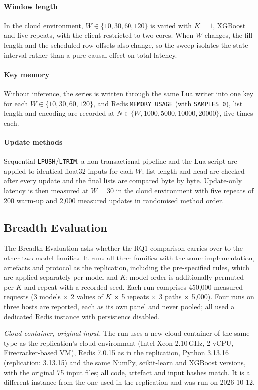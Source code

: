 \documentclass[a4paper,fleqn]{cas-dc}
\begin{document}
\paragraph{Window length} In the cloud environment, $W\in\{10,30,60,120\}$ is varied with $K=1$, XGBoost and five repeats, with the client restricted to two cores. When $W$ changes, the fill length and the scheduled row offsets also change, so the sweep isolates the state interval rather than a pure causal effect on total latency.

\paragraph{Key memory} Without inference, the series is written through the same Lua writer into one key for each $W\in\{10,30,60,120\}$, and Redis \texttt{MEMORY USAGE} (with \texttt{SAMPLES 0}), list length and encoding are recorded at $N\in\{W,1000,5000,10000,20000\}$, five times each.

\paragraph{Update methods} Sequential \texttt{LPUSH}/\texttt{LTRIM}, a non-transactional pipeline and the Lua script are applied to identical float32 inputs for each $W$; list length and head are checked after every update and the final lists are compared byte by byte. Update-only latency is then measured at $W=30$ in the cloud environment with five repeats of 200 warm-up and 2,000 measured updates in randomised method order.

\subsection{Breadth Evaluation}
\label{subsec:extension_design}
The Breadth Evaluation asks whether the RQ1 comparison carries over to the other two model families. It runs all three families with the same implementation, artefacts and protocol as the replication, including the pre-specified rules, which are applied separately per model and $K$; model order is additionally permuted per $K$ and repeat with a recorded seed. Each run comprises 450,000 measured requests (3 models $\times$ 2 values of $K$ $\times$ 5 repeats $\times$ 3 paths $\times$ 5,000). Four runs on three hosts are reported, each as its own panel and never pooled; all used a dedicated Redis instance with persistence disabled.

\emph{Cloud container, original input.} The run uses a new cloud container of the same type as the replication's cloud environment (Intel Xeon 2.10\,GHz, 2 vCPU, Firecracker-based VM), Redis 7.0.15 as in the replication, Python 3.13.16 (replication: 3.13.15) and the same NumPy, scikit-learn and XGBoost versions, with the original 75 input files; all code, artefact and input hashes match. It is a different instance from the one used in the replication and was run on 2026-10-12.
\end{document}
